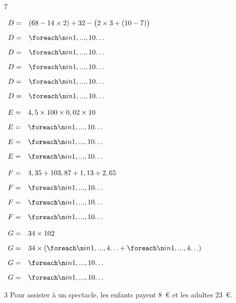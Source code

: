\documentclass[a4paper]{book}
\begin{document}
{\begin{exerciceNote}{7}
\begin{minipage}{0.35\linewidth}
            \bigskip

            $\begin{array}{ll}
                D = & (68-14\times2)+32-\big(2\times3+(10-7)\big) \\[2ex]
                D = & \points[10]\\[2ex]
                D = & \points[10]\\[2ex]
                D = & \points[10]\\[2ex]
                D = & \points[10]\\[2ex]
                D = & \points[10]
            \end{array}$
        \end{minipage}
        \vline
        \begin{minipage}{0.3\linewidth}
            $\begin{array}{ll}
                E = & 4,5\times 100 \times 0,02 \times 10 \\[2ex]
                E = & \points[10]\\[2ex]
                E = & \points[10]\\[2ex]
                E = & \points[10]
            \end{array}$

            \bigskip

            $\begin{array}{ll}
                F = & 4,35 + 103,87+1,13+2,65 \\[2ex]
                F = & \points[10]\\[2ex]
                F = & \points[10]\\[2ex]
                F = & \points[10]
            \end{array}$

            \bigskip

            $\begin{array}{ll}
                G = & 34\times102 \\[2ex]
                G = & 34\times (\points[4]+\points[4])\\[2ex]
                G = & \points[10]\\[2ex]
                G = & \points[10]
            \end{array}$
        \end{minipage}
    \end{exerciceNote}


    \begin{exerciceNote}{3}
        Pour assister à un spectacle, les enfants payent 8~\euro{} et les adultes 23~\euro{}.


\end{exerciceNote}}
\end{document}
